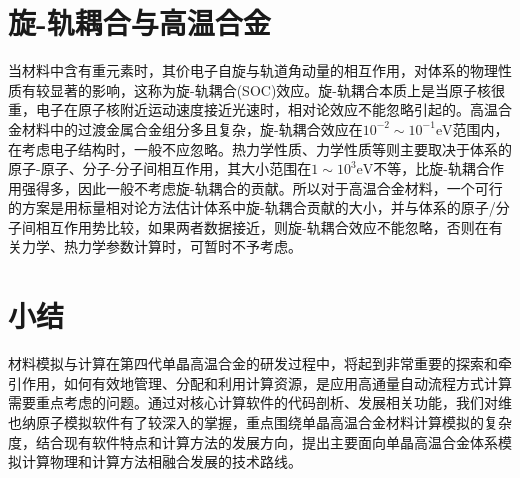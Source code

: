 \section{旋-轨耦合与高温合金}
当材料中含有重元素时，其价电子自旋与轨道角动量的相互作用，对体系的物理性质有较显著的影响，这称为旋-轨耦合\textrm{(SOC)}效应。旋-轨耦合本质上是当原子核很重，电子在原子核附近运动速度接近光速时，相对论效应不能忽略引起的。高温合金材料中的过渡金属合金组分多且复杂，旋-轨耦合效应在$10^{-2}\sim10^{-1}\mathrm{eV}$范围内，在考虑电子结构时，一般不应忽略。热力学性质、力学性质等则主要取决于体系的原子-原子、分子-分子间相互作用，其大小范围在$1\sim10^3\mathrm{eV}$不等，比旋-轨耦合作用强得多，因此一般不考虑旋-轨耦合的贡献。所以对于高温合金材料，一个可行的方案是用标量相对论方法估计体系中旋-轨耦合贡献的大小，并与体系的原子/分子间相互作用势比较，如果两者数据接近，则旋-轨耦合效应不能忽略，否则在有关力学、热力学参数计算时，可暂时不予考虑。

\section{小结}
材料模拟与计算在第四代单晶高温合金的研发过程中，将起到非常重要的探索和牵引作用，如何有效地管理、分配和利用计算资源，是应用高通量自动流程方式计算需要重点考虑的问题。通过对核心计算软件的代码剖析、发展相关功能，我们对维也纳原子模拟软件有了较深入的掌握，重点围绕单晶高温合金材料计算模拟的复杂度，结合现有软件特点和计算方法的发展方向，提出主要面向单晶高温合金体系模拟计算物理和计算方法相融合发展的技术路线。
